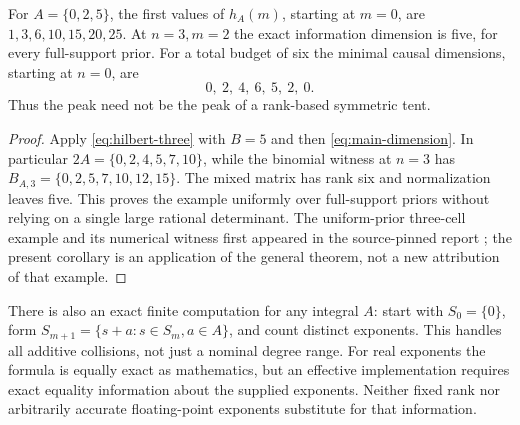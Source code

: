 \begin{corollary}\label{cor:sparse-example}
For $A=\{0,2,5\}$, the first values of $h_A(m)$, starting at $m=0$,
are $1,3,6,10,15,20,25$. At $n=3,m=2$ the exact information dimension
is five, for every full-support prior. For a total budget of six the
minimal causal dimensions, starting at $n=0$, are
\[
 0,\ 2,\ 4,\ 6,\ 5,\ 2,\ 0.
\]
Thus the peak need not be the peak of a rank-based symmetric tent.
\end{corollary}
\begin{proof}
Apply \eqref{eq:hilbert-three} with $B=5$ and then
\eqref{eq:main-dimension}. In particular
$2A=\{0,2,4,5,7,10\}$, while the binomial witness at $n=3$ has
$B_{A,3}=\{0,2,5,7,10,12,15\}$. The mixed matrix has rank six
and normalization leaves five. This proves the example uniformly over
full-support priors without relying on a single large rational determinant.
The uniform-prior three-cell example and its numerical witness first
appeared in the source-pinned report \cite{A1review}; the present
corollary is an application of the general theorem, not a new attribution
of that example.
\end{proof}

There is also an exact finite computation for any integral $A$: start
with $S_0=\{0\}$, form $S_{m+1}=\{s+a:s\in S_m,a\in A\}$, and
count distinct exponents. This handles all additive collisions, not just
a nominal degree range. For real exponents the formula is equally exact
as mathematics, but an effective implementation requires exact equality
information about the supplied exponents. Neither fixed rank nor arbitrarily
accurate floating-point exponents substitute for that information.
